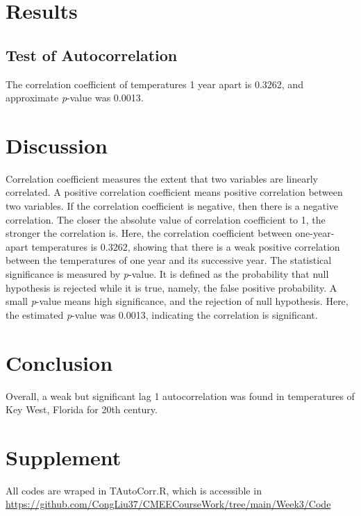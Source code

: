 \documentclass[12pt]{article}
\begin{document}
  \section{Results}

    \subsection{Test of Autocorrelation}
    The correlation coefficient of temperatures 1 year apart is 0.3262, and approximate 
    \textit{p}-value was 0.0013.

  \section{Discussion}
  Correlation coefficient measures the extent that two variables are linearly correlated.
  A positive correlation coefficient means positive correlation between two variables. If 
  the correlation coefficient is negative, then there is a negative correlation. The closer
  the absolute value of correlation coefficient to 1, the stronger the correlation is. Here, the
  correlation coefficient between one-year-apart temperatures is 0.3262, showing that there is a weak 
  positive correlation between the temperatures of one year and its successive year.
  \newline
  The statistical significance is measured by \textit{p}-value. It is defined as the probability that
  null hypothesis is rejected while it is true, namely, the false positive probability. A 
  small \textit{p}-value means high significance, and the rejection of null hypothesis. Here, the 
  estimated \textit{p}-value was 0.0013, indicating the correlation is significant.

  \section{Conclusion}
  Overall, a weak but significant lag 1 autocorrelation was found in temperatures of Key West, Florida 
  for 20th century.

  \section{Supplement}
  All codes are wraped in TAutoCorr.R, which is accessible in 
  \newline
  \href{https://github.com/CongLiu37/CMEECourseWork/tree/main/Week3/Code}{https://github.com/CongLiu37/CMEECourseWork/tree/main/Week3/Code}
\end{document}
